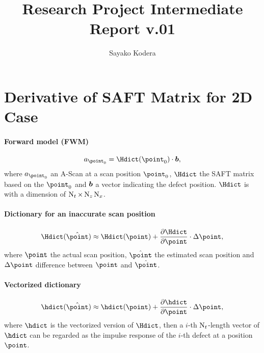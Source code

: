 \documentclass{article}
\author{Sayako Kodera}
\title{Research Project Intermediate Report v.01}
\begin{document}
\maketitle

\section{Derivative of SAFT Matrix for 2D Case}
\paragraph*{Forward model (FWM)}
\begin{equation}
\ascan_{\point_{0}} = \Hdict (\point_{0}) \cdot \defect ,
\end{equation}
%
where $\ascan_{\point_{0}}$ an A-Scan at a scan position $\point_0$,  $\Hdict$ the SAFT matrix based on the $\point_0$ and $\bm{b}$ a vector indicating the defect position. $\Hdict$ is with a dimension of $\operatorname{N}_{t} \times \operatorname{N}_{z} \operatorname{N}_{x}$.

\paragraph*{Dictionary for an inaccurate scan position}
\begin{equation}
\Hdict ( \hat{\point} ) \approx \Hdict (\point) + \frac{\partial \Hdict}{\partial \point} \cdot \Delta \point ,
\end{equation}
%
where $\point$ the actual scan position, $\hat{\point}$ the estimated scan position and $\Delta \point$ difference between $\point$ and $\hat{\point}$.\\

\paragraph*{Vectorized dictionary}
\begin{equation}
\hdict ( \hat{\point} ) \approx \hdict (\point) + \frac{\partial \hdict}{\partial \point} \cdot \Delta \point ,
\end{equation}
%
where $\hdict$ is the vectorized version of $\Hdict$, then a $i$-th $\operatorname{N}_t$-length vector of $\hdict$ can be regarded as the impulse response of the $i$-th defect at a position $\point$. 
\end{document}
